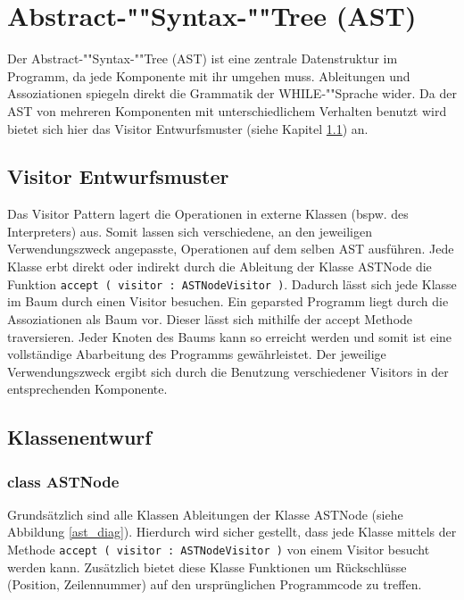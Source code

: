\section{Abstract-""Syntax-""Tree (AST)}

\begin{landscape}

Der Abstract-""Syntax-""Tree (AST) ist eine zentrale Datenstruktur im Programm, da jede Komponente mit ihr umgehen muss. Ableitungen und Assoziationen spiegeln direkt die Grammatik der WHILE-""Sprache wider. Da der AST von mehreren Komponenten mit unterschiedlichem Verhalten benutzt wird bietet sich hier das Visitor Entwurfsmuster (siehe Kapitel \ref{astvisitor_sec}) an.

\subsection{Visitor Entwurfsmuster}
\label{astvisitor_sec}
Das Visitor Pattern lagert die Operationen in externe Klassen (bspw. des Interpreters) aus. Somit lassen sich verschiedene, an den jeweiligen Verwendungszweck angepasste, Operationen auf dem selben AST ausführen. Jede Klasse erbt direkt oder indirekt durch die Ableitung der Klasse ASTNode die Funktion \texttt{accept ( visitor : ASTNodeVisitor )}. Dadurch lässt sich jede Klasse im Baum durch einen Visitor besuchen.
Ein geparsted Programm liegt durch die Assoziationen als Baum vor. Dieser lässt sich mithilfe der accept Methode traversieren. Jeder Knoten des Baums kann so erreicht werden und somit ist eine vollständige Abarbeitung des Programms gewährleistet. Der jeweilige Verwendungszweck ergibt sich durch die Benutzung verschiedener Visitors in der entsprechenden Komponente. 

\subsection{Klassenentwurf}
\subsubsection{class ASTNode}
\label{astnode_class}
Grundsätzlich sind alle Klassen Ableitungen der Klasse ASTNode (siehe Abbildung \ref{ast_diag}). Hierdurch wird sicher gestellt, dass jede Klasse mittels der Methode \texttt{accept ( visitor : ASTNodeVisitor )} von einem Visitor besucht werden kann. Zusätzlich bietet diese Klasse Funktionen um Rückschlüsse (Position, Zeilennummer) auf den ursprünglichen Programmcode zu treffen.


\end{landscape}
